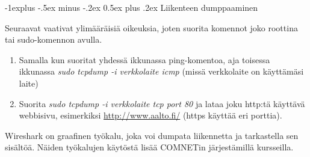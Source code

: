 \documentclass[12pt,portrait,a4]{article}
\makeatletter
\renewcommand{\subsection}{\@startsection{subsection}{2}{0mm}%
                                {-1explus -.5ex minus -.2ex}%
                                {0.5ex plus .2ex}%
                                {\normalfont\normalsize\bfseries}}
\makeatother
\begin{document}
\subsection{Liikenteen dumppaaminen}

Seuraavat vaativat ylimääräisiä oikeuksia, joten suorita komennot joko
roottina tai sudo-komennon avulla.
\begin{enumerate}
\item Samalla kun suoritat yhdessä ikkunassa ping-komentoa, aja toisessa ikkunassa
\emph{sudo tcpdump -i verkkolaite icmp} (missä verkkolaite on käyttämäsi laite)
\item Suorita \emph{sudo tcpdump -i verkkolaite tcp port 80} ja lataa joku http:tä
käyttävä webbisivu, esimerkiksi \url{http://www.aalto.fi/} (https käyttää eri porttia).
\end{enumerate}

Wireshark on graafinen työkalu, joka voi dumpata liikennetta ja tarkastella
sen sisältöä.  Näiden työkalujen käytöstä lisää COMNETin järjestämillä kursseilla. 
\end{document}
